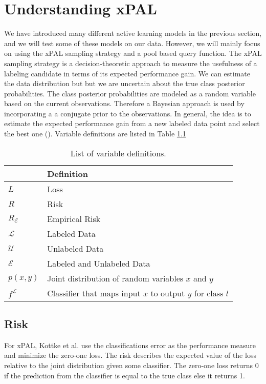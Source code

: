 \chapter{Understanding xPAL}

We have introduced many different active learning models in the previous section, and we will test some of these models on our data. However, we will mainly focus on using the xPAL sampling strategy and a pool based query function. The xPAL sampling strategy is a decision-theoretic approach to measure the usefulness of a labeling candidate in terms of its expected performance gain. We can estimate the data distribution but but we are uncertain about the true class posterior probabilities. The class posterior probabilities are modeled as a random variable based on the current observations. Therefore a Bayesian approach is used by incorporating a a conjugate prior to the observations. In general, the idea is to estimate the expected performance gain from a new labeled data point and select the best one (\cite{kottke2021toward}). Variable definitions are listed in Table \ref{tab:var_defs}

\begin{table}[ht]
\centering
\begin{tabular}{|l|l|}
\hline
{} & \textbf{Definition} \\
\hline
$\textit{L}$ & Loss \\
\hline
$\textit{R}$ & Risk \\
\hline
$\textit{R}_{\mathcal{E}}$ & Empirical Risk \\
\hline
$\mathcal{L}$ & Labeled Data \\
\hline
$\mathcal{U}$ & Unlabeled Data \\
\hline
$\mathcal{E}$ & Labeled and Unlabeled Data \\
\hline
$p(x,y)$ & Joint distribution of random variables $x$ and $y$ \\
\hline
$f^{\mathcal{L}}$ & Classifier that maps input $x$ to output $y$ for class $l$ \\
\hline
\end{tabular}
\caption{List of variable definitions.}
\label{tab:var_defs}
\end{table}

\section{Risk}

For xPAL, Kottke et al. use the classifications error as the performance measure and minimize the zero-one loss. The risk describes the expected value of the loss relative to the joint distribution given some classifier. The zero-one loss returns 0 if the prediction from the classifier is equal to the true class else it returns 1.

